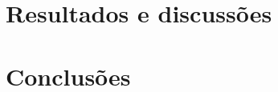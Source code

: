\documentclass[
	12pt,				%
	openany,			%
	twoside,			%
	a4paper,			%
	english,			%
	french,				%
	spanish,			%
	brazil,				%
	oldfontcommands
	]{abntex2}
\begin{document}
\chapter[Resultados e discussões]{Resultados e discussões}

\chapter[Conclusões]{Conclusões}



\end{document}
